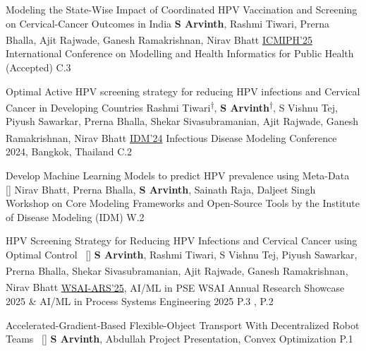 \begin{publications}

    
\publication
    {Modeling the State-Wise Impact of Coordinated HPV Vaccination and Screening on Cervical-Cancer Outcomes in India}{}
    {\textbf{S Arvinth}, Rashmi Tiwari, Prerna Bhalla, Ajit Rajwade, Ganesh Ramakrishnan, Nirav Bhatt\textsuperscript{\scriptsize\Letter}}
	{\href{https://www.ndmconsortium.com/conference/}{ICMIPH'25}} {International Conference on Modelling and Health Informatics for Public Health (Accepted)} {\label{C3}C.3}
    
\publication
    {Optimal Active HPV screening strategy for  reducing HPV infections and Cervical Cancer in Developing Countries}{}
    {Rashmi Tiwari\textsuperscript{\scriptsize$\dagger$}, \textbf{S Arvinth}\textsuperscript{\scriptsize$\dagger$}, S Vishnu Tej, Piyush Sawarkar, Prerna Bhalla, Shekar Sivasubramanian, Ajit Rajwade, Ganesh Ramakrishnan\textsuperscript{\scriptsize\Letter}, Nirav Bhatt\textsuperscript{\scriptsize\Letter}}
	{\href{https://idmconference.net}{IDM'24}} {Infectious Disease Modeling Conference 2024, Bangkok, Thailand} {\label{C2}C.2}


\publication
    {Develop Machine Learning Models to predict HPV prevalence using Meta-Data}{~ [\href{https://drive.google.com/file/d/18OeqXJsH5UlcADv9BqmLsevJpaieyaGK/view?usp=share_link}{\small{\linkSymbol}}]}
    {Nirav Bhatt, Prerna Bhalla, \textbf{S Arvinth}, Sainath Raja, Daljeet Singh}
	{} {Workshop on Core Modeling Frameworks and Open-Source Tools by the Institute of Disease Modeling (IDM)} {\label{W2}W.2}

\publication
    {HPV Screening Strategy for Reducing HPV Infections and Cervical Cancer using Optimal Control}{~ [\href{https://drive.google.com/file/d/1BsFnnMTJNzk1_xexh_piD-pYr50h6kdn/view?usp=share_link}{\small{\linkSymbol}}]}
    {\textbf{S Arvinth}, Rashmi Tiwari, S Vishnu Tej, Piyush Sawarkar, Prerna Bhalla, Shekar Sivasubramanian, Ajit Rajwade, Ganesh Ramakrishnan\textsuperscript{\scriptsize\Letter}, Nirav Bhatt\textsuperscript{\scriptsize\Letter}}
	{\href{https://sites.google.com/dsai.iitm.ac.in/wsai-annualresearchshowcase25/home}{WSAI-ARS'25}, AI/ML in PSE} {WSAI Annual Research Showcase 2025 \& AI/ML in Process Systems Engineering 2025} {\label{P3P2}P.3 , P.2}

\publication
    {Accelerated-Gradient-Based Flexible-Object Transport With Decentralized Robot Teams}{~ [\href{https://drive.google.com/file/d/1xsXKjbRhfmpGYq08KXAfmIdlPCLl681K/view?usp=sharing}{\small{\linkSymbol}}]}
    {\textbf{S Arvinth}, Abdullah} 
	{} {Project Presentation, Convex Optimization} {\label{P1}P.1}



\end{publications}
